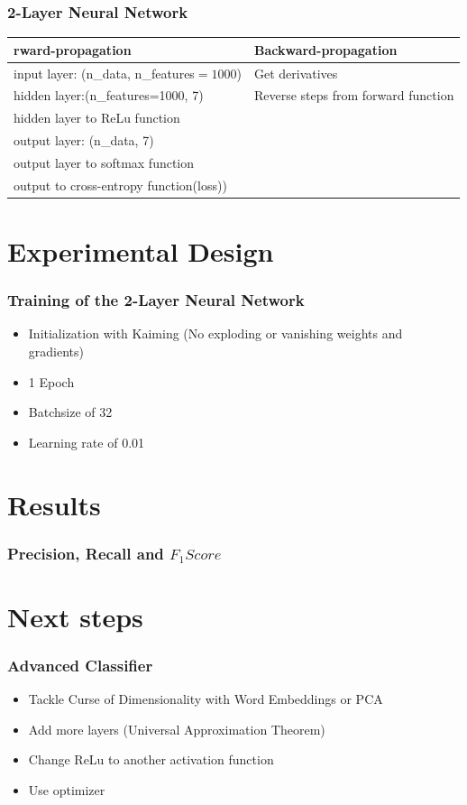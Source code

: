 \documentclass[aspectratio=169]{beamer}
\begin{document}
\begin{frame}
\frametitle{2-Layer Neural Network}
\begin{tabular}{m{6.5cm}|m{6.5cm}}                          
rward-propagation & Backward-propagation \\
\midrule

input layer: (n\_data, n\_features$=1000$) & Get derivatives\\
hidden layer:(n\_features=1000, 7) & Reverse steps from forward function  \\
hidden layer to ReLu function & \\
output layer: (n\_data, 7) & \\
output layer to softmax function  & \\
output to cross-entropy function(loss))&

\end{tabular}

\end{frame}



\section{Experimental Design}
\begin{frame}
\frametitle{Training of the 2-Layer Neural Network}

\begin{itemize}

\item Initialization with Kaiming (No exploding or vanishing weights and gradients)
\item 1 Epoch
\item Batchsize of 32
\item Learning rate of 0.01

\end{itemize}

\end{frame}

\section{Results}
\begin{frame}
\frametitle{Precision, Recall and $F_1Score$}
\end{frame}

\section{Next steps}

\begin{frame}
\frametitle{Advanced Classifier}
\begin{itemize}
\item Tackle Curse of Dimensionality with Word Embeddings or PCA
\item Add more layers (Universal Approximation Theorem)
\item Change ReLu to another activation function
\item Use optimizer
\end{itemize}
\end{frame}
\end{document}
